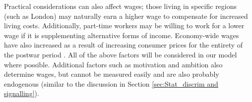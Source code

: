 \documentclass[class=article, crop=false]{standalone}
\begin{document}
Practical considerations can also affect wages; those living in specific regions (such as London) may naturally earn a higher wage to compensate for increased living costs. Additionally, part-time workers may be willing to work for a lower wage if it is supplementing alternative forms of income. Economy-wide wages have also increased as a result of increasing consumer prices for the entirety of the postwar period \citep{WorldBank}. All of the above factors will be considered in our model where possible. Additional factors such as motivation and ambition also determine wages, but cannot be measured easily and are also probably endogenous (similar to the discussion in Section \ref{sec:Stat_discrim and signalling}).

\ifstandalone

\fi
\end{document}
